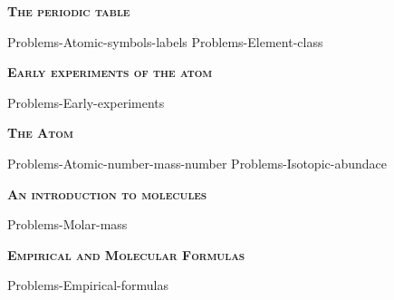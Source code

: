 \documentclass[main.tex]{subfiles}
\newcommand\chapterlabel{Ch-Table}
\begin{document}
\newpage
\setdoublesep{0.35700 em}  %
\setatomsep{1.78500 em}    %
\setbondoffset{0.18265 em} %
\newcommand{\bondwidth}{0.06642 em} %
\setbondstyle{line width = \bondwidth}
\fancyhfoffset[E,O]{0pt}
\setlength{\columnsep}{30pt}
\begin{conclusion}
\end{conclusion}
\begin{multicols*}{2}\setcounter{numA}{1}  %


{\raggedright\textsc{\textbf{The periodic table }}\par}
{Problems-Atomic-symbols-labels}
{Problems-Element-class}


{\raggedright\textsc{\textbf{Early experiments of the atom }}\par}
{Problems-Early-experiments}


{\raggedright\textsc{\textbf{The Atom }}\par}
{Problems-Atomic-number-mass-number}
{Problems-Isotopic-abundace}

{\raggedright\textsc{\textbf{An introduction to molecules }}\par}%
{Problems-Molar-mass}%


{\raggedright\textsc{\textbf{Empirical and Molecular Formulas }}\par} %
{Problems-Empirical-formulas}%

%
%



\end{multicols*}
\end{document}
